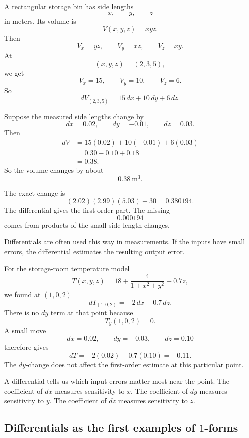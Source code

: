 \begin{example}
A rectangular storage bin has side lengths
\[
    x,\qquad y,\qquad z
\]
in meters.  Its volume is
\[
    V(x,y,z)=xyz.
\]
Then
\[
    V_x=yz,
    \qquad
    V_y=xz,
    \qquad
    V_z=xy.
\]
At
\[
    (x,y,z)=(2,3,5),
\]
we get
\[
    V_x=15,
    \qquad
    V_y=10,
    \qquad
    V_z=6.
\]
So
\[
    dV_{(2,3,5)}
    =
    15\,dx+10\,dy+6\,dz.
\]

Suppose the measured side lengths change by
\[
    dx=0.02,
    \qquad
    dy=-0.01,
    \qquad
    dz=0.03.
\]
Then
\[
\begin{aligned}
dV
&=
15(0.02)+10(-0.01)+6(0.03)\\
&=
0.30-0.10+0.18\\
&=
0.38.
\end{aligned}
\]
So the volume changes by about
\[
    0.38\ \text{m}^3.
\]

The exact change is
\[
    (2.02)(2.99)(5.03)-30
    =
    0.380194.
\]
The differential gives the first-order part.  The missing
\[
    0.000194
\]
comes from products of the small side-length changes.
\end{example}

Differentials are often used this way in measurements.  If the inputs have small errors,
the differential estimates the resulting output error.

\begin{example}
For the storage-room temperature model
\[
    T(x,y,z)=18+\frac{4}{1+x^2+y^2}-0.7z,
\]
we found at \((1,0,2)\)
\[
    dT_{(1,0,2)}=-2\,dx-0.7\,dz.
\]
There is no \(dy\) term at that point because
\[
    T_y(1,0,2)=0.
\]
A small move
\[
    dx=0.02,\qquad dy=-0.03,\qquad dz=0.10
\]
therefore gives
\[
    dT=-2(0.02)-0.7(0.10)=-0.11.
\]
The \(dy\)-change does not affect the first-order estimate at this particular point.
\end{example}

A differential tells us which input errors matter most near the point.  The coefficient
of \(dx\) measures sensitivity to \(x\).  The coefficient of \(dy\) measures sensitivity to
\(y\).  The coefficient of \(dz\) measures sensitivity to \(z\).

\subsection{Differentials as the first examples of \texorpdfstring{\(1\)-forms}{1-forms}}

